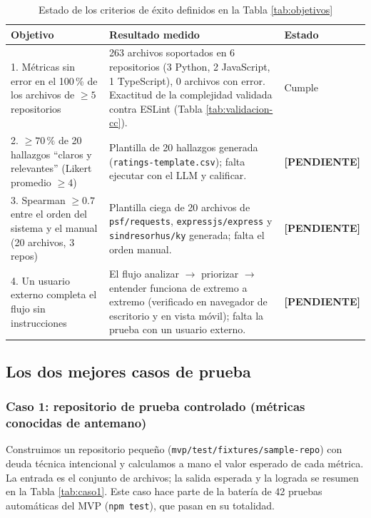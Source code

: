 \begin{table}[H]
\centering
\caption{Estado de los criterios de éxito definidos en la Tabla \ref{tab:objetivos}}
\label{tab:cumplimiento}
\begin{tabular}{p{} p{} p{}}
\toprule
\textbf{Objetivo} & \textbf{Resultado medido} & \textbf{Estado} \\
\midrule
1. Métricas sin error en el 100\,\% de los archivos de $\geq 5$ repositorios & 263 archivos soportados en 6 repositorios (3 Python, 2 JavaScript, 1 TypeScript), 0 archivos con error. Exactitud de la complejidad validada contra ESLint (Tabla \ref{tab:validacion-cc}). & Cumple \\[4pt]
2. $\geq 70\,\%$ de 20 hallazgos ``claros y relevantes'' (Likert promedio $\geq 4$) & Plantilla de 20 hallazgos generada (\texttt{ratings-template.csv}); falta ejecutar con el LLM y calificar. & \textbf{[PENDIENTE]} \\[4pt]
3. Spearman $\geq 0.7$ entre el orden del sistema y el manual (20 archivos, 3 repos) & Plantilla ciega de 20 archivos de \texttt{psf/requests}, \texttt{expressjs/express} y \texttt{sindresorhus/ky} generada; falta el orden manual. & \textbf{[PENDIENTE]} \\[4pt]
4. Un usuario externo completa el flujo sin instrucciones & El flujo analizar $\to$ priorizar $\to$ entender funciona de extremo a extremo (verificado en navegador de escritorio y en vista móvil); falta la prueba con un usuario externo. & \textbf{[PENDIENTE]} \\
\bottomrule
\end{tabular}
\end{table}

\subsection{Los dos mejores casos de prueba}

\subsubsection*{Caso 1: repositorio de prueba controlado (métricas conocidas de antemano)}

Construimos un repositorio pequeño (\texttt{mvp/test/fixtures/sample-repo}) con deuda técnica intencional y calculamos a mano el valor esperado de cada métrica. La entrada es el conjunto de archivos; la salida esperada y la lograda se resumen en la Tabla \ref{tab:caso1}. Este caso hace parte de la batería de 42 pruebas automáticas del MVP (\texttt{npm test}), que pasan en su totalidad.

